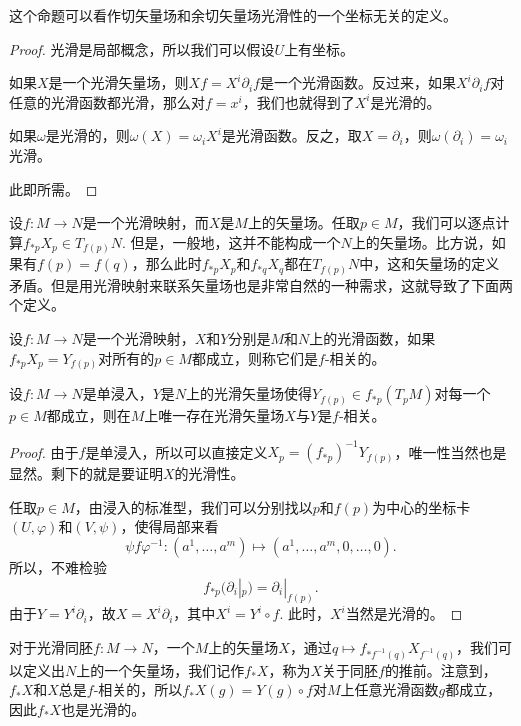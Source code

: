 这个命题可以看作切矢量场和余切矢量场光滑性的一个坐标无关的定义。

\begin{proof}
光滑是局部概念，所以我们可以假设$U$上有坐标。
\begin{compactenum}
\item 如果$X$是一个光滑矢量场，则$Xf=X^i\partial_if$是一个光滑函数。反过来，如果$X^i\partial_if$对任意的光滑函数都光滑，那么对$f=x^i$，我们也就得到了$X^i$是光滑的。
\item 如果$\omega$是光滑的，则$\omega(X)=\omega_iX^i$是光滑函数。反之，取$X=\partial_i$，则$\omega(\partial_i)=\omega_i$光滑。
\end{compactenum}
此即所需。
\end{proof}

设$f:M\to N$是一个光滑映射，而$X$是$M$上的矢量场。任取$p\in M$，我们可以逐点计算$f_{*p}X_p\in T_{f(p)}N$. 但是，一般地，这并不能构成一个$N$上的矢量场。比方说，如果有$f(p)=f(q)$，那么此时$f_{*p}X_p$和$f_{*q}X_q$都在$T_{f(p)}N$中，这和矢量场的定义矛盾。但是用光滑映射来联系矢量场也是非常自然的一种需求，这就导致了下面两个定义。

\begin{para}
设$f:M\to N$是一个光滑映射，$X$和$Y$分别是$M$和$N$上的光滑函数，如果$f_{*p}X_p=Y_{f(p)}$对所有的$p\in M$都成立，则称它们是$f$-相关的。
\end{para}

\begin{pro}\label{pro:3.5}
设$f:M\to N$是单浸入，$Y$是$N$上的光滑矢量场使得$Y_{f(p)}\in f_{*p}(T_pM)$对每一个$p\in M$都成立，则在$M$上唯一存在光滑矢量场$X$与$Y$是$f$-相关。
\end{pro}

\begin{proof}
由于$f$是单浸入，所以可以直接定义$X_p=(f_{*p})^{-1}Y_{f(p)}$，唯一性当然也是显然。剩下的就是要证明$X$的光滑性。

任取$p\in M$，由浸入的标准型，我们可以分别找以$p$和$f(p)$为中心的坐标卡$(U,\varphi)$和$(V,\psi)$，使得局部来看
\[
	\psi f\varphi^{-1}:(a^1,\dots,a^m)\mapsto (a^1,\dots,a^m,0,\dots,0).
\]
所以，不难检验
\[
	f_{*p}(\partial_i|_p)=\partial_i|_{f(p)}.
\]
由于$Y=Y^i\partial_i$，故$X=X^i\partial_i$，其中$X^i=Y^i\circ f$. 此时，$X^i$当然是光滑的。
\end{proof}

\begin{para}[矢量场的推前]
对于光滑同胚$f:M\to N$，一个$M$上的矢量场$X$，通过$q\mapsto f_{*f^{-1}(q)}X_{f^{-1}(q)}$，我们可以定义出$N$上的一个矢量场，我们记作$f_*X$，称为$X$关于同胚$f$的推前。注意到，$f_*X$和$X$总是$f$-相关的，所以$f_*X(g)=Y(g)\circ f$对$M$上任意光滑函数$g$都成立，因此$f_*X$也是光滑的。
\end{para}

